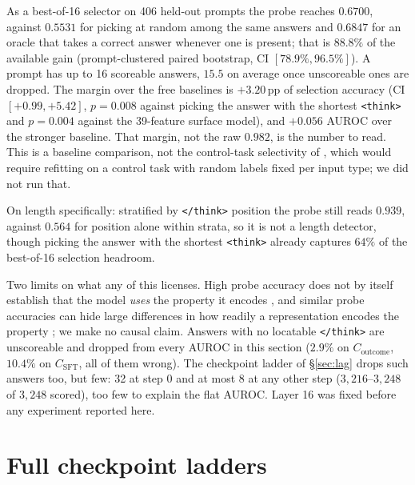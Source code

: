 \documentclass{article}
\begin{document}
As a best-of-16 selector on 406 held-out prompts the probe reaches $0.6700$, against $0.5531$ for picking at random among the same answers and $0.6847$ for an oracle that takes a correct answer whenever one is present; that is $88.8\%$ of the available gain (prompt-clustered paired bootstrap, CI $[78.9\%, 96.5\%]$). A prompt has up to 16 scoreable answers, $15.5$ on average once unscoreable ones are dropped. The margin over the free baselines is $+3.20$\,pp of selection accuracy (CI $[+0.99, +5.42]$, $p = 0.008$ against picking the answer with the shortest \texttt{<think>} and $p = 0.004$ against the 39-feature surface model), and $+0.056$ AUROC over the stronger baseline. That margin, not the raw $0.982$, is the number to read. This is a baseline comparison, not the control-task selectivity of \citet{hewitt2019control}, which would require refitting on a control task with random labels fixed per input type; we did not run that.

On length specifically: stratified by \texttt{</think>} position the probe still reads $0.939$, against $0.564$ for position alone within strata, so it is not a length detector, though picking the answer with the shortest \texttt{<think>} already captures $64\%$ of the best-of-16 selection headroom.

Two limits on what any of this licenses. High probe accuracy does not by itself establish that the model \emph{uses} the property it encodes \citep{belinkov2022probing}, and similar probe accuracies can hide large differences in how readily a representation encodes the property \citep{voita2020mdl}; we make no causal claim. Answers with no locatable \texttt{</think>} are unscoreable and dropped from every AUROC in this section ($2.9\%$ on $C_{\text{outcome}}$, $10.4\%$ on $C_{\text{SFT}}$, all of them wrong). The checkpoint ladder of \S\ref{sec:lag} drops such answers too, but few: 32 at step 0 and at most 8 at any other step ($3{,}216$--$3{,}248$ of $3{,}248$ scored), too few to explain the flat AUROC. Layer 16 was fixed before any experiment reported here.

\section{Full checkpoint ladders}\label{app:ladders}
\end{document}
